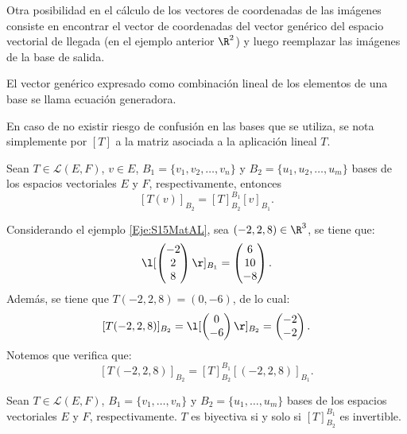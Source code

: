 \documentclass[compacto,10pt]{pubciencias-notas}
\begin{document}
\begin{obs}
    Otra posibilidad en el cálculo de los vectores de coordenadas de las imágenes consiste en encontrar el vector de coordenadas del vector genérico del espacio vectorial de llegada (en el ejemplo anterior $\R^{2}$) y luego reemplazar las imágenes de la base de salida.

    \noindent El vector genérico expresado como combinación lineal de los elementos de una base se llama ecuación generadora.
\end{obs}

\begin{advertencia}
En caso de no existir riesgo de confusión en las bases que se utiliza, se nota simplemente por $[T]$ a la matriz asociada a la aplicación lineal $T$. 
\end{advertencia}

\begin{prop}
    Sean $T \in \mathscr{L}(E,F)$, $v \in E$, $B_{1} = \{v_1,v_2,\ldots,v_n\}$ y 
    \noindent $B_{2} = \{u_1,u_2,\ldots,u_m\}$ bases de los espacios vectoriales $E$ y $F$, respectivamente, entonces
    \[
        [T(v)]_{B_{2}} = [T]^{B_{1}}_{B_{2}} [v]_{B_{1}}.
    \]
\end{prop}

\begin{ejem}\hspace{0pt} Considerando el ejemplo \ref{Eje:S15MatAL}, sea $(-2,2,8)\in\R^3$, se tiene que:
\[
    \l[\begin{pmatrix}-2\\2\\8\end{pmatrix}\r]_{B_{1}} = \begin{pmatrix}6\\10\\-8\end{pmatrix}.
\]
Además, se tiene que $T(-2,2,8) = (0,-6)$, de lo cual:
\[
    [T(-2,2,8)]_{B_{2}} = \l[\begin{pmatrix}0\\-6\end{pmatrix}\r]_{B_{2}} = \begin{pmatrix}-2\\-2\end{pmatrix}.
\]
Notemos que verifica que:
\[
    [T(-2,2,8)]_{B_{2}} = [T]^{B_{1}}_{B_{2}} [(-2,2,8)]_{B_{1}}.
\]
\end{ejem}

\begin{prop}\label{Prop:inv}
    Sean $T \in \mathscr{L}(E,F)$, $B_{1} = \{ v_{1}, \ldots, v_{n} \}$ y $B_{2} = \{ u_{1}, \ldots, u_{m} \}$ bases de los espacios vectoriales $E$ y $F$, respectivamente. $T$ es biyectiva si y solo si $[T]^{B_{1}}_{B_{2}}$ es invertible.
\end{prop}
\end{document}
